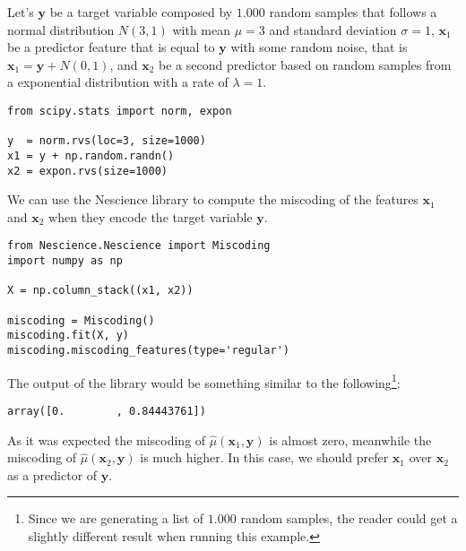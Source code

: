 \begin{example}

Let's $\mathbf{y}$ be a target variable composed by $1.000$ random samples that follows a normal distribution $N(3,1)$ with mean $\mu = 3$ and standard deviation $\sigma = 1$, $\mathbf{x}_1$ be a predictor feature that is equal to $\mathbf{y}$ with some random noise, that is $\mathbf{x}_1 = \mathbf{y} + N(0, 1)$, and $\mathbf{x}_2$ be a second predictor based on random samples from a exponential distribution with a rate of $\lambda = 1$.

\begin{sourcecode}
{\scriptsize \begin{verbatim}
from scipy.stats import norm, expon

y  = norm.rvs(loc=3, size=1000)
x1 = y + np.random.randn()
x2 = expon.rvs(size=1000)
\end{verbatim}}
\end{sourcecode}

We can use the Nescience library to compute the miscoding of the features $\mathbf{x}_1$ and $\mathbf{x}_2$ when they encode the target variable $\mathbf{y}$.

\begin{sourcecode}
{\scriptsize \begin{verbatim}
from Nescience.Nescience import Miscoding
import numpy as np

X = np.column_stack((x1, x2))

miscoding = Miscoding()
miscoding.fit(X, y)
miscoding.miscoding_features(type='regular')
\end{verbatim}}
\end{sourcecode}

The output of the library would be something similar to the following\footnote{Since we are generating a list of $1.000$ random samples, the reader could get a slightly different result when running this example.}:

\begin{sourcecode}
{\scriptsize \begin{verbatim}
array([0.        , 0.84443761])
\end{verbatim}}
\end{sourcecode}

As it was expected the miscoding of $\hat\mu(\mathbf{x}_1, \mathbf{y})$ is almost zero, meanwhile the miscoding of $\hat\mu(\mathbf{x}_2, \mathbf{y})$ is much higher. In this case, we should prefer $\mathbf{x}_1$ over $\mathbf{x}_2$ as a predictor of $\mathbf{y}$.

\end{example}

